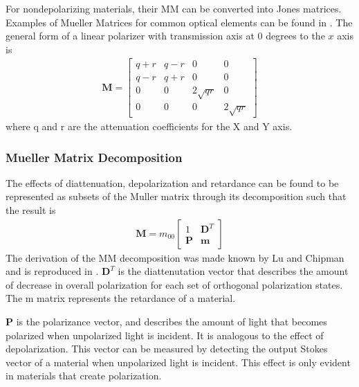 For nondepolarizing materials, their MM can be converted into Jones matrices.   Examples of Mueller Matrices for common optical elements can be found in \cite{chipman}.  The general form of a linear polarizer with transmission axis at 0 degrees to the $x$ axis is
%
\begin{align}
    \mathbf{M} =
    \begin{bmatrix}
        q + r & q - r & 0 & 0 \\
        q-r & q+r & 0  & 0 \\
        0 & 0 & 2\sqrt{qr} & 0 \\
        0 & 0 & 0 & 2\sqrt{qr}
    \end{bmatrix}
\end{align}
%
where q and r are the attenuation coefficients for the X and Y axis.

\subsubsection{Mueller Matrix Decomposition}

The effects of diattenuation, depolarization and retardance can be found to be represented as subsets of the Muller matrix through its decomposition such that the result is
\begin{align}
    \mathbf{M} = m_{00}
    \begin{bmatrix}
        1 & \mathbf{D}^T \\
        \mathbf{P} & \mathbf{m}
    \end{bmatrix}
\end{align}
The derivation of the MM decomposition was made known by Lu and Chipman and is reproduced in \cite{polarizedlight}. $\mathbf{D}^T$ is the diattenutation vector that describes the amount of decrease in overall polarization for each set of orthogonal polarization states. The m matrix represents the retardance of a material.

$\mathbf{P}$ is the polarizance vector, and describes the amount of light that becomes polarized when unpolarized light is incident.  It is analogous to the effect of depolarization.  This vector can be measured by detecting the output Stokes vector of a material when unpolarized light is incident.  This effect is only evident in materials that create polarization.
